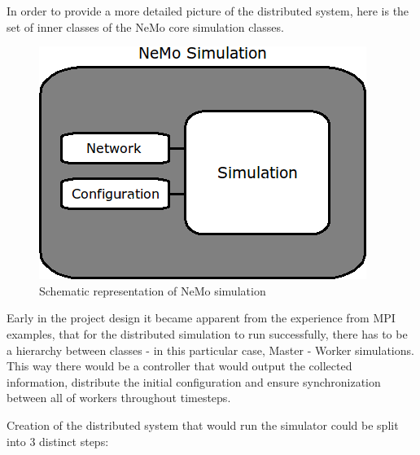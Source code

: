 In order to provide a more detailed picture of the distributed system, here is the set of inner classes of the NeMo core simulation classes.

\begin{figure}[h!]
\begin{center}
\includegraphics[scale = 0.6]{images/nemo_simulation_schematic.png}
\end{center}
\caption{Schematic representation of NeMo simulation}
\end{figure}

Early in the project design it became apparent from the experience from MPI examples, that for the distributed simulation to run successfully, there has to be a hierarchy between classes - in this particular case, Master - Worker simulations. This way there would be a controller that would output the collected information, distribute the initial configuration and ensure synchronization between all of workers throughout timesteps.

Creation of the distributed system that would run the simulator could be split into 3 distinct steps:

